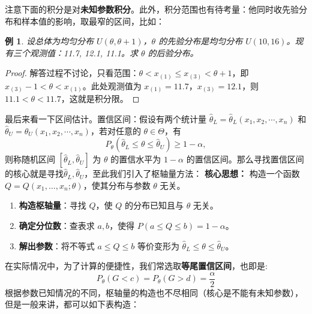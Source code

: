 \documentclass[a4paper]{ctexart}
\newtheorem{example}{例}[section]
\begin{document}
\begin{tipbox}
    注意下面的积分是对\textbf{未知参数积分}。此外，积分范围也有待考量：他同时收先验分布和样本值的影响，取最窄的区间，比如：
    \begin{example}
        设总体为均匀分布 \(U(\theta, \theta + 1)\)，\(\theta\) 的先验分布是均匀分布 \(U(10, 16)\)。现有三个观测值：11.7, 12.1, 11.1。求 \(\theta\) 的后验分布。
    \end{example}
    \begin{proof}
        解答过程不讨论，只看范围：\(\theta < x_{(1)} \leq x_{(3)} < \theta + 1\)，即 \(x_{(3)} - 1 < \theta < x_{(1)}\)。此处观测值为 \(x_{(1)} = 11.7\)，\(x_{(3)} = 12.1\)，则 \(11.1 < \theta < 11.7\)，这就是积分限。
    \end{proof}
\end{tipbox}

最后来看一下区间估计。置信区间：假设有两个统计量 \(\hat{\theta}_L = \hat{\theta}_L(x_1, x_2, \cdots, x_n)\) 和 \(\hat{\theta}_U = \hat{\theta}_U(x_1, x_2, \cdots, x_n)\)，若对任意的 \(\theta \in \Theta\)，有
\begin{equation}
    P_\theta(\hat{\theta}_L \leq \theta \leq \hat{\theta}_U) \geq 1 - \alpha,
\end{equation}
则称随机区间 \([\hat{\theta}_L, \hat{\theta}_U]\) 为 \(\theta\) 的置信水平为 \(1 - \alpha\) 的置信区间。那么寻找置信区间的核心就是寻找$\hat{\theta}_L, \hat{\theta}_U$，至此我们引入了枢轴量方法：
\textbf{核心思想：} 构造一个函数 \(Q = Q(x_1, \ldots, x_n; \theta)\)，使其分布与参数 \(\theta\) 无关。

\begin{enumerate}
    \item \textbf{构造枢轴量}：寻找 \(Q\)，使 \(Q\) 的分布已知且与 \(\theta\) 无关。
    \item \textbf{确定分位数}：查表求 \(a, b\)，使得 \(P(a \leq Q \leq b) = 1 - \alpha\)。
    \item \textbf{解出参数}：将不等式 \(a \leq Q \leq b\) 等价变形为 \(\hat{\theta}_L \leq \theta \leq \hat{\theta}_U\)。
\end{enumerate}
在实际情况中，为了计算的便捷性，我们常选取\textbf{等尾置信区间}，也即是:
\begin{equation}
    P_\theta(G < c) = P_\theta(G > d) = \frac{\alpha}{2}
\end{equation}
根据参数已知情况的不同，枢轴量的构造也不尽相同（核心是不能有未知参数），但是一般来讲，都可以如下表构造：
\end{document}
